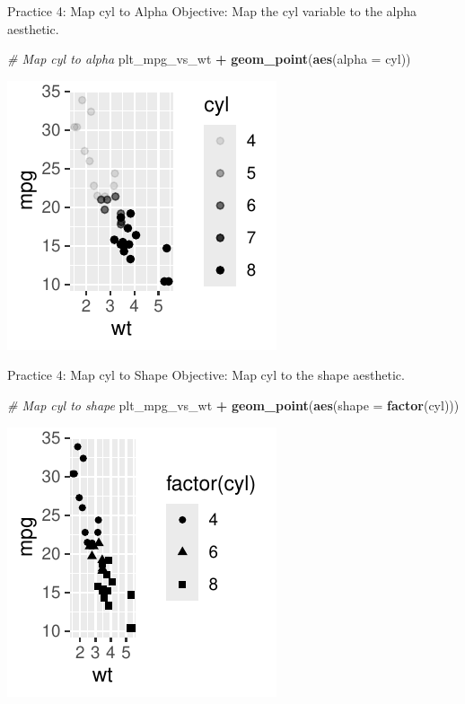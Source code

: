 \documentclass[
  ignorenonframetext,
]{beamer}
\newenvironment{Shaded}{\begin{snugshade}}{\end{snugshade}}
\newcommand{\AttributeTok}[1]{\textcolor[rgb]{0.13,0.29,0.53}{#1}}
\newcommand{\CommentTok}[1]{\textcolor[rgb]{0.56,0.35,0.01}{\textit{#1}}}
\newcommand{\FunctionTok}[1]{\textcolor[rgb]{0.13,0.29,0.53}{\textbf{#1}}}
\newcommand{\NormalTok}[1]{#1}
\newcommand{\SpecialCharTok}[1]{\textcolor[rgb]{0.81,0.36,0.00}{\textbf{#1}}}
\begin{document}
\begin{frame}[fragile]{Practice 4: Map cyl to Alpha}
\label{practice-4-map-cyl-to-alpha}
Objective: Map the cyl variable to the alpha aesthetic.

\begin{Shaded}
\begin{Highlighting}[]
\CommentTok{\# Map cyl to alpha}
\NormalTok{plt\_mpg\_vs\_wt }\SpecialCharTok{+} \FunctionTok{geom\_point}\NormalTok{(}\FunctionTok{aes}\NormalTok{(}\AttributeTok{alpha =}\NormalTok{ cyl))}
\end{Highlighting}
\end{Shaded}

\begin{center}\includegraphics[width=0.5\linewidth]{Figs/unnamed-chunk-18-1} \end{center}
\end{frame}

\begin{frame}[fragile]{Practice 4: Map cyl to Shape}
\label{practice-4-map-cyl-to-shape}
Objective: Map cyl to the shape aesthetic.

\begin{Shaded}
\begin{Highlighting}[]
\CommentTok{\# Map cyl to shape}
\NormalTok{plt\_mpg\_vs\_wt }\SpecialCharTok{+} \FunctionTok{geom\_point}\NormalTok{(}\FunctionTok{aes}\NormalTok{(}\AttributeTok{shape =} \FunctionTok{factor}\NormalTok{(cyl)))}
\end{Highlighting}
\end{Shaded}

\begin{center}\includegraphics[width=0.5\linewidth]{Figs/unnamed-chunk-19-1} \end{center}
\end{frame}
\end{document}
